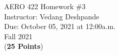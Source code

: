 \documentclass[]{article}
\begin{document}

\begin{center}
    {\Large AERO 422 Homework \#3}\\ %
    \vspace{0.2 cm}
    Instructor: Vedang Deshpande\\ %
    \vspace{0.2 cm}
    Due: October 05, 2021 at 12:00a.m.\\ %
    \vspace{0.2 cm}
    Fall 2021\\ %
    \vspace{0.2 cm}
    (\textbf{25 Points})\\
\end{center}

\vspace{0.2 cm}
\end{document}
